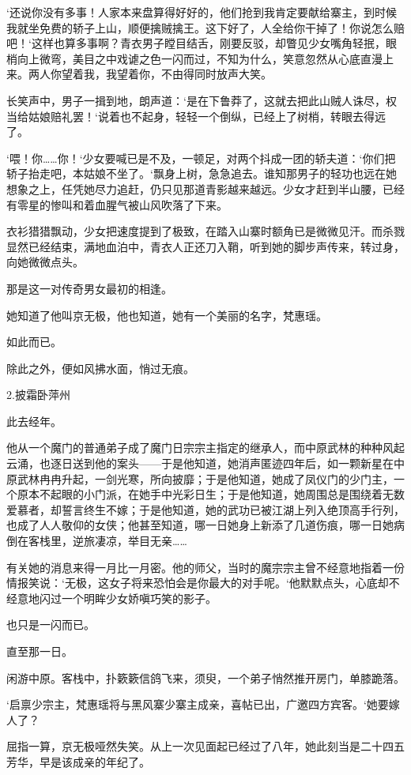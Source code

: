 ‘还说你没有多事！人家本来盘算得好好的，他们抢到我肯定要献给寨主，到时候我就坐免费的轿子上山，顺便擒贼擒王。这下好了，人全给你干掉了！你说怎么赔吧！‘这样也算多事啊？青衣男子瞠目结舌，刚要反驳，却瞥见少女嘴角轻抿，眼梢向上微弯，美目之中戏谑之色一闪而过，不知为什么，笑意忽然从心底直漫上来。两人你望着我，我望着你，不由得同时放声大笑。

长笑声中，男子一揖到地，朗声道：‘是在下鲁莽了，这就去把此山贼人诛尽，权当给姑娘赔礼罢！‘说着也不起身，轻轻一个倒纵，已经上了树梢，转眼去得远了。

‘喂！你……你！‘少女要喊已是不及，一顿足，对两个抖成一团的轿夫道：‘你们把轿子抬走吧，本姑娘不坐了。‘飘身上树，急急追去。谁知那男子的轻功也远在她想象之上，任凭她尽力追赶，仍只见那道青影越来越远。少女才赶到半山腰，已经有零星的惨叫和着血腥气被山风吹落了下来。

衣衫猎猎飘动，少女把速度提到了极致，在踏入山寨时额角已是微微见汗。而杀戮显然已经结束，满地血泊中，青衣人正还刀入鞘，听到她的脚步声传来，转过身，向她微微点头。

那是这一对传奇男女最初的相逢。

她知道了他叫京无极，他也知道，她有一个美丽的名字，梵惠瑶。

如此而已。

除此之外，便如风拂水面，悄过无痕。

2.披霜卧萍州

此去经年。

他从一个魔门的普通弟子成了魔门日宗宗主指定的继承人，而中原武林的种种风起云涌，也逐日送到他的案头——于是他知道，她消声匿迹四年后，如一颗新星在中原武林冉冉升起，一剑光寒，所向披靡；于是他知道，她成了凤仪门的少门主，一个原本不起眼的小门派，在她手中光彩日生；于是他知道，她周围总是围绕着无数爱慕者，却誓言终生不嫁；于是他知道，她的武功已被江湖上列入绝顶高手行列，也成了人人敬仰的女侠；他甚至知道，哪一日她身上新添了几道伤痕，哪一日她病倒在客栈里，逆旅凄凉，举目无亲……

有关她的消息来得一月比一月密。他的师父，当时的魔宗宗主曾不经意地指着一份情报笑说：‘无极，这女子将来恐怕会是你最大的对手呢。‘他默默点头，心底却不经意地闪过一个明眸少女娇嗔巧笑的影子。

也只是一闪而已。

直至那一日。

闲游中原。客栈中，扑簌簌信鸽飞来，须臾，一个弟子悄然推开房门，单膝跪落。

‘启禀少宗主，梵惠瑶将与黑风寨少寨主成亲，喜帖已出，广邀四方宾客。‘她要嫁人了？

屈指一算，京无极哑然失笑。从上一次见面起已经过了八年，她此刻当是二十四五芳华，早是该成亲的年纪了。

